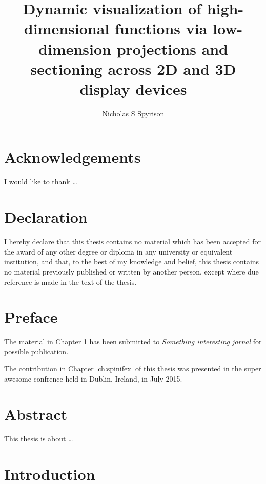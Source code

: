 \documentclass{monashthesis}
\author{Nicholas S Spyrison}
\title{Dynamic visualization of high-dimensional functions via low-dimension
projections and sectioning across 2D and 3D display devices}
\begin{document}

\titlepage

{\sf\tighttoc\doublespacing}

\chapter*{Acknowledgements}\label{acknowledgements}

I would like to thank \dots

\chapter*{Declaration}\label{declaration}

I hereby declare that this thesis contains no material which has been
accepted for the award of any other degree or diploma in any university
or equivalent institution, and that, to the best of my knowledge and
belief, this thesis contains no material previously published or written
by another person, except where due reference is made in the text of the
thesis.

\vspace*{2cm}\par\authorname

\chapter*{Preface}\label{preface}

The material in Chapter \ref{ch:intro} has been submitted to
\emph{Something interesting jornal} for possible publication.

The contribution in Chapter \ref{ch:spinifex} of this thesis was
presented in the super awesome confrence held in Dublin, Ireland, in
July 2015.

\chapter*{Abstract}\label{abstract}

This thesis is about \ldots{}

\clearpage{}\setcounter{page}{0}

\chapter{Introduction}\label{ch:intro}
\end{document}
